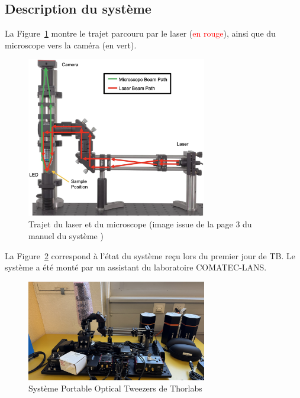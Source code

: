 \subsection{Description du système}
La Figure~\ref{chemin_laser_caméra} montre le trajet parcouru par le laser (\textcolor{red}{en rouge}), ainsi que du microscope vers la caméra (\textcolor[RGB]{0, 120, 0}{en vert}).
\begin{figure}[H]
    \begin{center}
        \includegraphics[width=0.7\textwidth]{assets/figures/Introduction/chemin_laser_camera.jpeg}
    \end{center}
    \caption{Trajet du laser et du microscope (image issue de la page 3 du manuel du système \cite{manualPortableOpticalTweezers})}
    \label{chemin_laser_caméra}
\end{figure}

La Figure~\ref{kit_vierge} correspond à l'état du système reçu lors du premier jour de TB. Le système a été monté par un assistant du laboratoire COMATEC-LANS.

\begin{figure}[H]
    \begin{center}
        \includegraphics[width=0.7\textwidth]{assets/figures/Introduction/kit_vierge.jpeg}
    \end{center}
    \caption{Système Portable Optical Tweezers de Thorlabs}
    \label{kit_vierge}
\end{figure}

